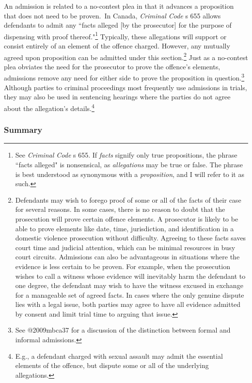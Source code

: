 An admission is related to a no-contest plea in that it advances a proposition that does not need to be proven.\ In Canada, \textit{Criminal Code} s 655 allows defendants to admit any ``facts alleged [by the prosecutor] for the purpose of dispensing with proof thereof."\footnote{See \textit{Criminal Code} s 655. If \textit{facts} signify only true propositions, the phrase ``facts alleged" is nonsensical, as \textit{allegations} may be true or false. The phrase is best understood as synonymous with a \textit{proposition}, and I will refer to it as such.} Typically, these allegations will support or consist entirely of an element of the offence charged. However, any mutually agreed upon proposition can be admitted under this section.\footnote{Defendants may wish to forego proof of some or all of the facts of their case for several reasons. In some cases, there is no reason to doubt that the prosecution will prove certain offence elements. A prosecutor is likely to be able to prove elements like date, time, jurisdiction, and identification in a domestic violence prosecution without difficulty. Agreeing to these facts saves court time and judicial attention, which can be minimal resources in busy court circuits. Admissions can also be advantageous in situations where the evidence is less certain to be proven. For example, when the prosecution wishes to call a witness whose evidence will inevitably harm the defendant to one degree, the defendant may wish to have the witness excused in exchange for a manageable set of agreed facts. In cases where the only genuine dispute lies with a legal issue, both parties may agree to have all evidence admitted by consent and limit trial time to arguing that issue. } Just as a no-contest plea obviates the need for the prosecutor to prove the offence's elements, admissions remove any need for either side to prove the proposition in question.\footnote{See @2009mbca37 for a discussion of the distinction between formal and informal admissions.} Although parties to criminal proceedings most frequently use admissions in trials, they may also be used in sentencing hearings where the parties do not agree about the allegation's details.\footnote{E.g., a defendant charged with sexual assault may admit the essential elements of the offence, but dispute some or all of the underlying allegations.}

\subsubsection{Summary}

